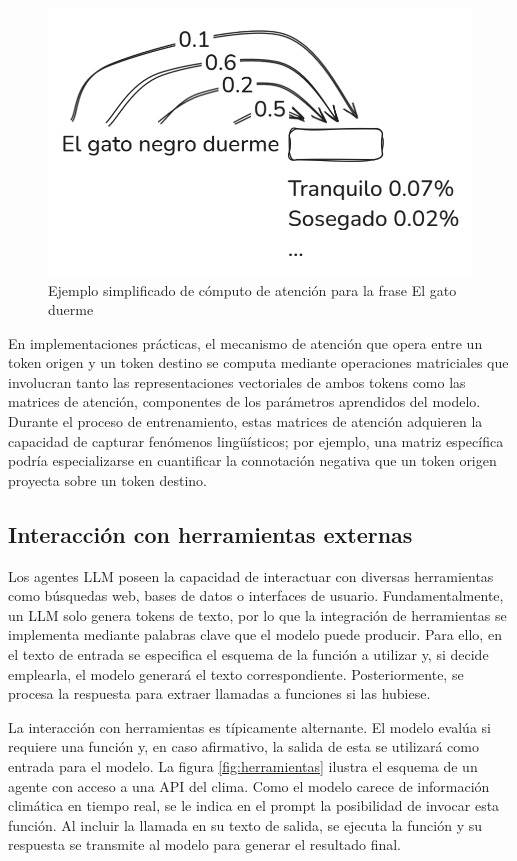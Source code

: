 \begin{figure}
    \centering
    \includegraphics[width=0.65\linewidth]{figures/atencion_poc.png}
    \caption{Ejemplo simplificado de cómputo de atención para la frase \textquotedbl El gato duerme\textquotedbl}
    \label{fig:atencion_gato}
\end{figure}

En implementaciones prácticas, el mecanismo de atención que opera entre un token origen y un token destino se computa mediante operaciones matriciales que involucran tanto las representaciones vectoriales de ambos tokens como las matrices de atención, componentes de los parámetros aprendidos del modelo. Durante el proceso de entrenamiento, estas matrices de atención adquieren la capacidad de capturar fenómenos lingüísticos; por ejemplo, una matriz específica podría especializarse en cuantificar la connotación negativa que un token origen proyecta sobre un token destino.

\subsection{Interacción con herramientas externas}
Los agentes LLM poseen la capacidad de interactuar con diversas herramientas como búsquedas web, bases de datos o interfaces de usuario. Fundamentalmente, un LLM solo genera tokens de texto, por lo que la integración de herramientas se implementa mediante palabras clave que el modelo puede producir. Para ello, en el texto de entrada se especifica el esquema de la función a utilizar y, si decide emplearla, el modelo generará el texto correspondiente. Posteriormente, se procesa la respuesta para extraer llamadas a funciones si las hubiese.

La interacción con herramientas es típicamente alternante. El modelo evalúa si requiere una función y, en caso afirmativo, la salida de esta se utilizará como entrada para el modelo. La figura \ref{fig:herramientas} ilustra el esquema de un agente con acceso a una API del clima. Como el modelo carece de información climática en tiempo real, se le indica en el prompt la posibilidad de invocar esta función. Al incluir la llamada en su texto de salida, se ejecuta la función y su respuesta se transmite al modelo para generar el resultado final.

